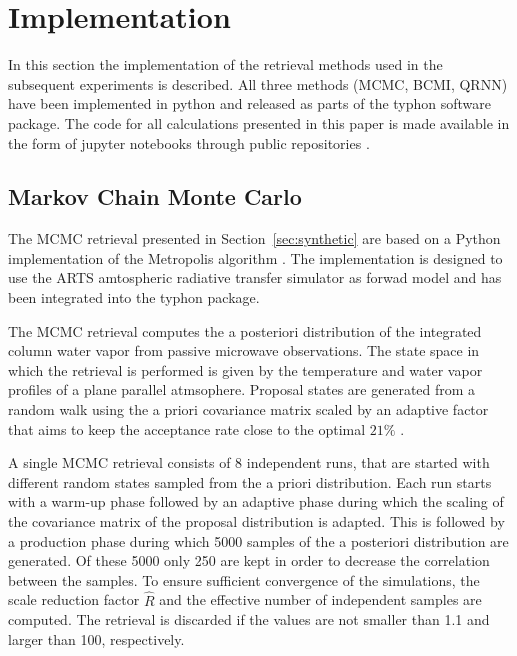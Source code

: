 \documentclass[journal abbreviation, manuscript]{copernicus}
\begin{document}
\section{Implementation}
\label{sec:implementation}

  In this section the implementation of the retrieval methods used in the
  subsequent experiments is described. All three methods (MCMC, BCMI, QRNN) have
  been implemented in python and released as parts of the typhon \cite{typhon}
  software package. The code for all calculations presented in this paper is
  made available in the form of jupyter notebooks through public repositories
  \cite{github_predictive_uncertainty, github_smhi}.

\subsection{Markov Chain Monte Carlo}

   The MCMC retrieval presented in Section~\ref{sec:synthetic} are based on
   a Python implementation of the Metropolis algorithm \citep[Ch. 12]{bda}.
   The implementation is designed to use the ARTS amtospheric radiative
   transfer simulator as forwad model and has been integrated into the
   typhon package.

   The MCMC retrieval computes the a posteriori distribution of the integrated
   column water vapor from passive microwave observations. The state space in
   which the retrieval is performed is given by the temperature and water vapor
   profiles of a plane parallel atmsophere. Proposal states are generated from a
   random walk using the a priori covariance matrix scaled by an adaptive factor
   that aims to keep the acceptance rate close to the optimal $21\%$
   \citep{bda}.

   A single MCMC retrieval consists of 8 independent runs, that are started with
   different random states sampled from the a priori distribution. Each run
   starts with a warm-up phase followed by an adaptive phase during which the
   scaling of the covariance matrix of the proposal distribution is adapted. This is
   followed by a production phase during which 5000 samples of the a posteriori
   distribution are generated. Of these 5000 only 250 are kept in order to decrease
   the correlation between the samples. To ensure sufficient convergence of the
   simulations, the scale reduction factor $\hat{R}$ and the effective number of
   independent samples \citep[eqs. (11.12), (11.13)]{bda} are computed. The
   retrieval is discarded if the values are not smaller than 1.1 and larger than
   100, respectively.
   
\end{document}
